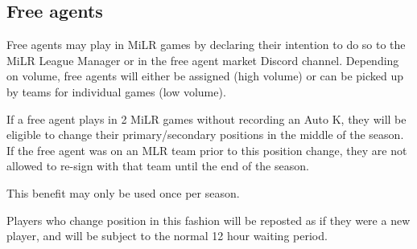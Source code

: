 \subsection{Free agents}
\begin{deepEnumerate}
    \item Free agents may play in MiLR games by declaring their intention to do so to the MiLR League Manager or in the free agent market Discord channel. 
    Depending on volume, free agents will either be assigned (high volume) or can be picked up by teams for individual games (low volume).
    \item If a free agent plays in 2 MiLR games without recording an Auto K, they will be eligible to change their primary/secondary positions in the middle of the season. 
    If the free agent was on an MLR team prior to this position change, they are not allowed to re-sign with that team until the end of the season.
    \begin{deepEnumerate}
        \item This benefit may only be used once per season.
        \item Players who change position in this fashion will be reposted as if they were a new player, and will be subject to the normal 12 hour waiting period.        
    \end{deepEnumerate}
\end{deepEnumerate}
